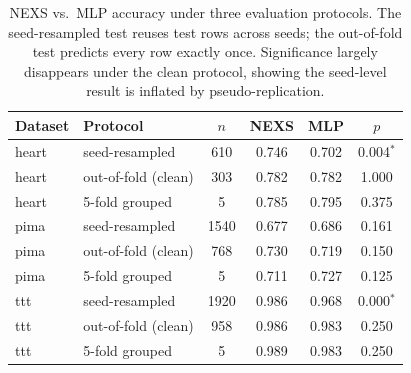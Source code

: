 \begin{table}[t]\centering\small
\caption{NEXS vs.\ MLP accuracy under three evaluation protocols. The seed-resampled test reuses test rows across seeds; the out-of-fold test predicts every row exactly once. Significance largely disappears under the clean protocol, showing the seed-level result is inflated by pseudo-replication.}
\label{tab:independent}
\begin{tabular}{llcccc}
\toprule
Dataset & Protocol & $n$ & NEXS & MLP & $p$ \\
\midrule
heart & seed-resampled & 610 & 0.746 & 0.702 & 0.004$^{*}$ \\
heart & out-of-fold (clean) & 303 & 0.782 & 0.782 & 1.000 \\
heart & 5-fold grouped & 5 & 0.785 & 0.795 & 0.375 \\
pima & seed-resampled & 1540 & 0.677 & 0.686 & 0.161 \\
pima & out-of-fold (clean) & 768 & 0.730 & 0.719 & 0.150 \\
pima & 5-fold grouped & 5 & 0.711 & 0.727 & 0.125 \\
ttt & seed-resampled & 1920 & 0.986 & 0.968 & 0.000$^{*}$ \\
ttt & out-of-fold (clean) & 958 & 0.986 & 0.983 & 0.250 \\
ttt & 5-fold grouped & 5 & 0.989 & 0.983 & 0.250 \\
\end{tabular}
\end{table}